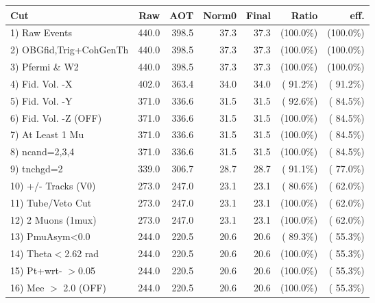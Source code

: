  \begin{table}[h!]\centering
 \begin{tabular}{||l||r|r|r|r|r|r||}
 \hline
 \hline
 Cut & Raw & AOT & Norm0 & Final & Ratio & eff.       \\
 \hline
  1) Raw Events           &        440.0 &        398.5 &         37.3 &         37.3 & (100.0\%) & (100.0\%) \\
  2) OBGfid,Trig+CohGenTh &        440.0 &        398.5 &         37.3 &         37.3 & (100.0\%) & (100.0\%) \\
  3) Pfermi \& W2         &        440.0 &        398.5 &         37.3 &         37.3 & (100.0\%) & (100.0\%) \\
  4) Fid. Vol. -X         &        402.0 &        363.4 &         34.0 &         34.0 & ( 91.2\%) & ( 91.2\%) \\
  5) Fid. Vol. -Y         &        371.0 &        336.6 &         31.5 &         31.5 & ( 92.6\%) & ( 84.5\%) \\
  6) Fid. Vol. -Z (OFF)   &        371.0 &        336.6 &         31.5 &         31.5 & (100.0\%) & ( 84.5\%) \\
  7) At Least 1 Mu        &        371.0 &        336.6 &         31.5 &         31.5 & (100.0\%) & ( 84.5\%) \\
  8) ncand=2,3,4          &        371.0 &        336.6 &         31.5 &         31.5 & (100.0\%) & ( 84.5\%) \\
  9) tnchgd=2             &        339.0 &        306.7 &         28.7 &         28.7 & ( 91.1\%) & ( 77.0\%) \\
 10) +/- Tracks (V0)      &        273.0 &        247.0 &         23.1 &         23.1 & ( 80.6\%) & ( 62.0\%) \\
 11) Tube/Veto Cut        &        273.0 &        247.0 &         23.1 &         23.1 & (100.0\%) & ( 62.0\%) \\
 12) 2 Muons (1mux)       &        273.0 &        247.0 &         23.1 &         23.1 & (100.0\%) & ( 62.0\%) \\
 13) PmuAsym<0.0          &        244.0 &        220.5 &         20.6 &         20.6 & ( 89.3\%) & ( 55.3\%) \\
 14) Theta$<$2.62 rad     &        244.0 &        220.5 &         20.6 &         20.6 & (100.0\%) & ( 55.3\%) \\
 15) Pt+wrt- $>$0.05      &        244.0 &        220.5 &         20.6 &         20.6 & (100.0\%) & ( 55.3\%) \\
 16) Mee $>$ 2.0  (OFF)   &        244.0 &        220.5 &         20.6 &         20.6 & (100.0\%) & ( 55.3\%) \\

\end{tabular}
\end{table}
